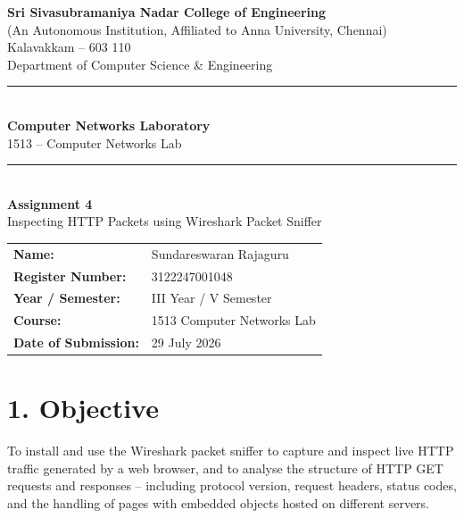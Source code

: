 \documentclass[11pt]{article}
\title{\vspace{-2cm}}
\date{}
\begin{document}
\begin{titlepage}
\centering
\vspace*{1cm}
{\large \textbf{Sri Sivasubramaniya Nadar College of Engineering}}\\
{\small (An Autonomous Institution, Affiliated to Anna University, Chennai)}\\
{\small Kalavakkam -- 603 110}\\[0.3cm]
{\small Department of Computer Science \& Engineering}\\[1.5cm]

\rule{\linewidth}{0.5mm}\\[0.4cm]
{\LARGE \textbf{Computer Networks Laboratory}}\\[0.3cm]
{\Large 1513 -- Computer Networks Lab}\\[0.4cm]
\rule{\linewidth}{0.5mm}\\[1.5cm]

{\huge \textbf{Assignment 4}}\\[0.4cm]
{\Large Inspecting HTTP Packets using Wireshark Packet Sniffer}\\[2cm]

\begin{center}
\begin{tabular}{ll}
\textbf{Name:} & Sundareswaran Rajaguru \\[0.2cm]
\textbf{Register Number:} & 3122247001048 \\[0.2cm]
\textbf{Year / Semester:} & III Year / V Semester \\[0.2cm]
\textbf{Course:} & 1513 Computer Networks Lab \\[0.2cm]
\textbf{Date of Submission:} & 29 July 2026 \\[0.2cm]
\end{tabular}
\end{center}

\vfill
\end{titlepage}

\section*{1. Objective}
To install and use the Wireshark packet sniffer to capture and inspect live HTTP traffic
generated by a web browser, and to analyse the structure of HTTP GET requests and responses --
including protocol version, request headers, status codes, and the handling of pages with
embedded objects hosted on different servers.
\end{document}
